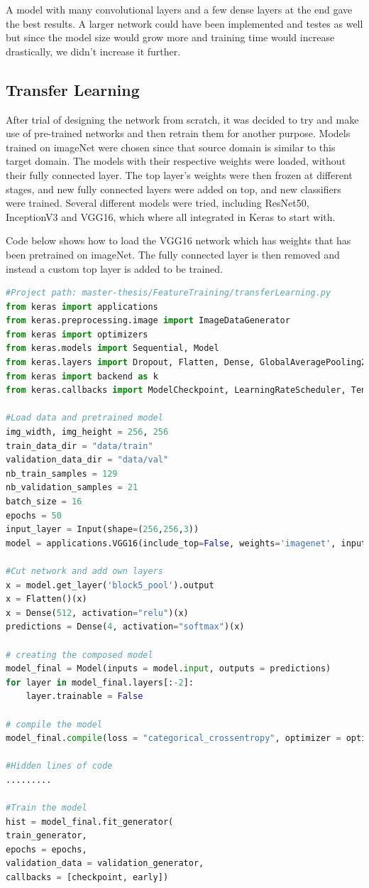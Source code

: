 A model with many convolutional layers and a few dense layers at the end gave the best
results. A larger network could have been implemented and testes as well but
since the model size would grow more and training time would increase drastically,
we didn't increase it further.

\subsection{Transfer Learning}
After trial of designing the network from scratch, it was decided to try and make use of 
pre-trained networks and then retrain them for another purpose. Models trained on 
imageNet \cite{imageNet} were chosen since that source domain is similar to this target 
domain. The models with their respective weights were loaded, without their fully 
connected layer. The top layer's weights were then frozen at different stages, and new 
fully connected layers were added on top, and new classifiers were trained. 
Several different models were tried, including ResNet50, InceptionV3 and VGG16, 
which where all integrated in Keras to start with.

Code below shows how to load the VGG16 network which has weights that has been pretrained on imageNet. The fully connected layer is then removed and instead a custom top layer is added to be trained. 
\begin{lstlisting}[language=python]
#Project path: master-thesis/FeatureTraining/transferLearning.py
from keras import applications
from keras.preprocessing.image import ImageDataGenerator
from keras import optimizers
from keras.models import Sequential, Model
from keras.layers import Dropout, Flatten, Dense, GlobalAveragePooling2D, Input, Conv2D, MaxPool2D
from keras import backend as k
from keras.callbacks import ModelCheckpoint, LearningRateScheduler, TensorBoard, EarlyStopping

#Load data and pretrained model
img_width, img_height = 256, 256
train_data_dir = "data/train"
validation_data_dir = "data/val"
nb_train_samples = 129
nb_validation_samples = 21
batch_size = 16
epochs = 50
input_layer = Input(shape=(256,256,3))
model = applications.VGG16(include_top=False, weights='imagenet', input_tensor=input_layer, pooling=None)

#Cut network and add own layers
x = model.get_layer('block5_pool').output
x = Flatten()(x)
x = Dense(512, activation="relu")(x)
predictions = Dense(4, activation="softmax")(x)

# creating the composed model
model_final = Model(inputs = model.input, outputs = predictions)
for layer in model_final.layers[:-2]:
    layer.trainable = False
    
# compile the model
model_final.compile(loss = "categorical_crossentropy", optimizer = optimizers.SGD(lr = 0.0001, momentum = 0.9), metrics=["accuracy"])

#Hidden lines of code
.........

#Train the model
hist = model_final.fit_generator(
train_generator,
epochs = epochs,
validation_data = validation_generator,
callbacks = [checkpoint, early])
\end{lstlisting}

